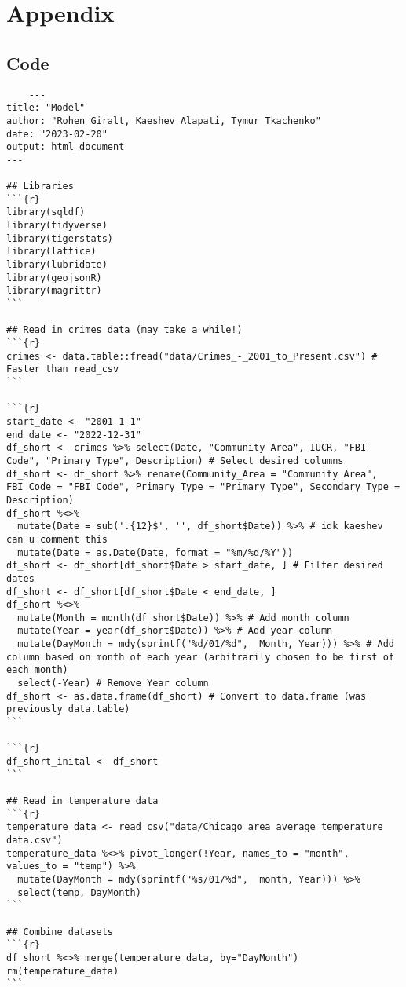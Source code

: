 \documentclass{article}
\begin{document}
\pagebreak
\section{Appendix}

\subsection{Code}
\begin{verbatim}
    ---
title: "Model"
author: "Rohen Giralt, Kaeshev Alapati, Tymur Tkachenko"
date: "2023-02-20"
output: html_document
---

## Libraries
```{r}
library(sqldf)
library(tidyverse)
library(tigerstats)
library(lattice)
library(lubridate)
library(geojsonR)
library(magrittr)
```

## Read in crimes data (may take a while!)
```{r}
crimes <- data.table::fread("data/Crimes_-_2001_to_Present.csv") # Faster than read_csv
```

```{r}
start_date <- "2001-1-1"
end_date <- "2022-12-31"
df_short <- crimes %>% select(Date, "Community Area", IUCR, "FBI Code", "Primary Type", Description) # Select desired columns
df_short <- df_short %>% rename(Community_Area = "Community Area", FBI_Code = "FBI Code", Primary_Type = "Primary Type", Secondary_Type = Description)
df_short %<>%
  mutate(Date = sub('.{12}$', '', df_short$Date)) %>% # idk kaeshev can u comment this
  mutate(Date = as.Date(Date, format = "%m/%d/%Y"))
df_short <- df_short[df_short$Date > start_date, ] # Filter desired dates
df_short <- df_short[df_short$Date < end_date, ]
df_short %<>%
  mutate(Month = month(df_short$Date)) %>% # Add month column
  mutate(Year = year(df_short$Date)) %>% # Add year column
  mutate(DayMonth = mdy(sprintf("%d/01/%d",  Month, Year))) %>% # Add column based on month of each year (arbitrarily chosen to be first of each month)
  select(-Year) # Remove Year column
df_short <- as.data.frame(df_short) # Convert to data.frame (was previously data.table)
```

```{r}
df_short_inital <- df_short
```

## Read in temperature data
```{r}
temperature_data <- read_csv("data/Chicago area average temperature data.csv")
temperature_data %<>% pivot_longer(!Year, names_to = "month", values_to = "temp") %>%
  mutate(DayMonth = mdy(sprintf("%s/01/%d",  month, Year))) %>%
  select(temp, DayMonth)
```

## Combine datasets
```{r}
df_short %<>% merge(temperature_data, by="DayMonth")
rm(temperature_data)
```


\end{verbatim}
\end{document}
